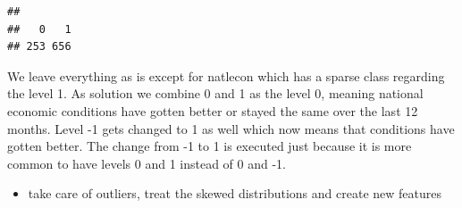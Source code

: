 \documentclass[
]{article}
\newenvironment{Shaded}{\begin{snugshade}}{\end{snugshade}}
\newcommand{\AttributeTok}[1]{\textcolor[rgb]{0.77,0.63,0.00}{#1}}
\newcommand{\CommentTok}[1]{\textcolor[rgb]{0.56,0.35,0.01}{\textit{#1}}}
\newcommand{\ControlFlowTok}[1]{\textcolor[rgb]{0.13,0.29,0.53}{\textbf{#1}}}
\newcommand{\DecValTok}[1]{\textcolor[rgb]{0.00,0.00,0.81}{#1}}
\newcommand{\FunctionTok}[1]{\textcolor[rgb]{0.00,0.00,0.00}{#1}}
\newcommand{\NormalTok}[1]{#1}
\newcommand{\OtherTok}[1]{\textcolor[rgb]{0.56,0.35,0.01}{#1}}
\newcommand{\SpecialCharTok}[1]{\textcolor[rgb]{0.00,0.00,0.00}{#1}}
\providecommand{\tightlist}{%
  \setlength{\itemsep}{0pt}\setlength{\parskip}{0pt}}
\begin{document}
\begin{verbatim}
## 
##   0   1 
## 253 656
\end{verbatim}

We leave everything as is except for natlecon which has a sparse class
regarding the level 1. As solution we combine 0 and 1 as the level 0,
meaning national economic conditions have gotten better or stayed the
same over the last 12 months. Level -1 gets changed to 1 as well which
now means that conditions have gotten better. The change from -1 to 1 is
executed just because it is more common to have levels 0 and 1 instead
of 0 and -1.

\begin{itemize}
\tightlist
\item
  take care of outliers, treat the skewed distributions and create new
  features
\end{itemize}

\begin{Shaded}
\end{Shaded}
\end{document}
